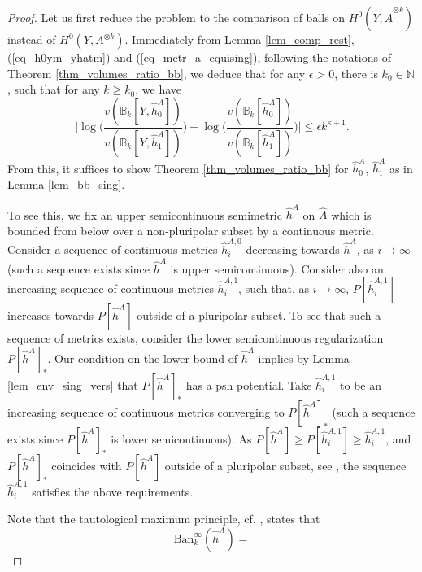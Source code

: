 \documentclass[12pt]{article}
\numberwithin{equation}{section}
\theoremstyle{theorem}
\theoremstyle{definition}
\theoremstyle{remark}
\newcommand{\vol}{v}
\newcommand{\nat}{\mathbb{N}}
\begin{document}
	\begin{proof}
		Let us first reduce the problem to the comparison of balls on $H^0(\widehat{Y}, \widehat{A}^{\otimes k})$ instead of $H^0(Y, A^{\otimes k})$.
		Immediately from Lemma \ref{lem_comp_rest}, (\ref{eq_h0ym_yhatm}) and (\ref{eq_metr_a_equising}), following the notations of Theorem \ref{thm_volumes_ratio_bb}, we deduce that for any $\epsilon > 0$, there is $k_0 \in \nat$, such that for any $k \geq k_0$, we have
		\begin{equation}
			\Big|
			\log \Big( \frac{\vol(\mathbb{B}_k[Y, \widehat{h}^A_0])}{\vol(\mathbb{B}_k[Y, \widehat{h}^A_1])}
			\Big)
			-
			\log \Big( \frac{\vol(\mathbb{B}_k[\widehat{h}^A_0])}{\vol(\mathbb{B}_k[\widehat{h}^A_1])}
			\Big)
			\Big|
			\leq
			\epsilon k^{\kappa + 1}.
		\end{equation}
		From this, it suffices to show Theorem \ref{thm_volumes_ratio_bb} for $\widehat{h}^A_0$, $\widehat{h}^A_1$ as in Lemma \ref{lem_bb_sing}.
		\par 
		To see this, we fix an upper semicontinuous semimetric $\widehat{h}^A$ on $\widehat{A}$ which is bounded from below over a non-pluripolar subset by a continuous metric.
		Consider a sequence of continuous metrics $\widehat{h}^{A, 0}_i$ decreasing towards $\widehat{h}^A$, as $i \to \infty$ (such a sequence exists since $\widehat{h}^A$ is upper semicontinuous).
		Consider also an increasing sequence of continuous metrics $\widehat{h}^{A, 1}_i$, such that, as $i \to \infty$, $P[\widehat{h}^{A, 1}_i]$ increases towards $P[\widehat{h}^A]$ outside of a pluripolar subset.
		To see that such a sequence of metrics exists, consider the lower semicontinuous regularization $P[\widehat{h}^A]_*$.
		Our condition on the lower bound of $\widehat{h}^A$ implies by Lemma \ref{lem_env_sing_vers} that $P[\widehat{h}^A]_*$ has a psh potential. 
		Take $\widehat{h}^{A, 1}_i$ to be an increasing sequence of continuous metrics converging to $P[\widehat{h}^A]_*$ (such a sequence exists since $P[\widehat{h}^A]_*$ is lower semicontinuous).
		As $P[\widehat{h}^A] \geq P[\widehat{h}^{A, 1}_i] \geq \widehat{h}^{A, 1}_i$, and $P[\widehat{h}^A]_*$ coincides with $P[\widehat{h}^A]$ outside of a pluripolar subset, see \cite{BedfordTaylor}, the sequence $\widehat{h}^{A, 1}_i$ satisfies the above requirements.
		\par 
		Note that the tautological maximum principle, cf. \cite[Proposition 1.8]{BermanBouckBalls}, states that
		\begin{equation}
			{\textrm{Ban}}_k^{\infty}(\widehat{h}^A)
			=

\end{equation}
\end{proof}
\end{document}
